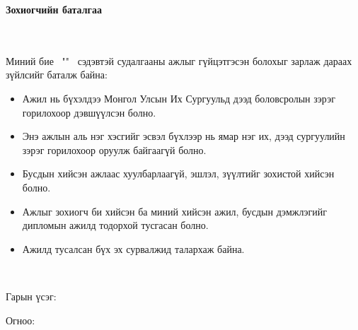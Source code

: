 \makefrontpage
\maketitle

\doublespace

\begin{huge}
\textbf{Зохиогчийн баталгаа}
\end{huge} \\ \ \\ 
\doublespace
Миний бие \@author \ "\@title" \ сэдэвтэй судалгааны ажлыг гүйцэтгэсэн болохыг зарлаж дараах зүйлсийг баталж байна:
\begin{itemize}
\item Ажил нь бүхэлдээ Монгол Улсын Их Сургуульд дээд боловсролын зэрэг горилохоор дэвшүүлсэн болно.
\item Энэ ажлын аль нэг хэсгийг эсвэл бүхлээр нь ямар нэг их, дээд сургуулийн зэрэг горилохоор оруулж байгаагүй болно.
\item Бусдын хийсэн ажлаас хуулбарлаагүй, эшлэл, зүүлтийг зохистой хийсэн болно.
\item Ажлыг зохиогч би хийсэн ба миний хийсэн ажил, бусдын дэмжлэгийг дипломын ажилд тодорхой тусгасан болно. 
\item Ажилд тусалсан бүх эх сурвалжид талархаж байна. 
\end{itemize} 
\ 

Гарын үсэг: \underline{\hspace{5cm}} 

Огноо: 	\ \ \underline{\hspace{3cm}}

\setcounter{tocdepth}{1}
\begingroup
\let\doublespace\oneandhalfspace
\tableofcontents
\endgroup
\doublespace

\listoffigures

\listoftables

\lstlistoflistings
\markboth{}{}



\newpage
\newpage

\renewcommand{\cftlabel}{Зураг}


\doublespace
{}
